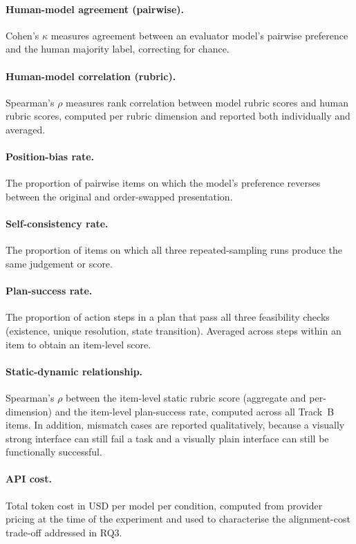 \paragraph{Human-model agreement (pairwise).}
Cohen's $\kappa$ measures agreement between an evaluator model's pairwise
preference and the human majority label, correcting for chance.

\paragraph{Human-model correlation (rubric).}
Spearman's $\rho$ measures rank correlation between model rubric scores
and human rubric scores, computed per rubric dimension and reported
both individually and averaged.

\paragraph{Position-bias rate.}
The proportion of pairwise items on which the model's preference
reverses between the original and order-swapped presentation.

\paragraph{Self-consistency rate.}
The proportion of items on which all three repeated-sampling runs
produce the same judgement or score.

\paragraph{Plan-success rate.}
The proportion of action steps in a plan that pass all three
feasibility checks (existence, unique resolution, state transition).
Averaged across steps within an item to obtain an item-level score.

\paragraph{Static-dynamic relationship.}
Spearman's $\rho$ between the item-level static rubric score
(aggregate and per-dimension) and the item-level plan-success rate,
computed across all Track~B items. In addition, mismatch cases are
reported qualitatively, because a visually strong interface can still
fail a task and a visually plain interface can still be functionally
successful.

\paragraph{API cost.}
Total token cost in USD per model per condition, computed from
provider pricing at the time of the experiment and used to
characterise the alignment-cost trade-off addressed in RQ3.

